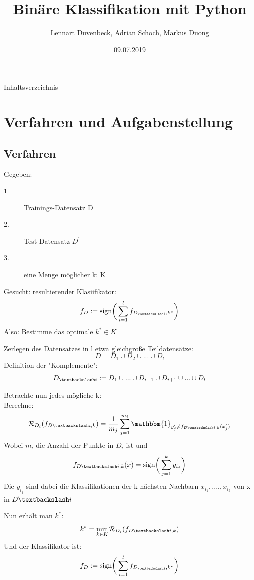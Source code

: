 \documentclass{beamer}
\title{Binäre Klassifikation mit Python}
\author{Lennart Duvenbeck, Adrian Schoch, Markus Duong}
\date{09.07.2019}
\begin{document}
\maketitle
\begin{frame}{Inhaltsverzeichnis}
  \tableofcontents
\end{frame}


\section{Verfahren und Aufgabenstellung}

\subsection{Verfahren}
\begin{frame}
Gegeben: 
\begin{description}
\item[1.] Trainings-Datensatz D
\item[2.] Test-Datensatz $D^{'}$
\item[3.] eine Menge möglicher k: K
\end{description}
Gesucht: resultierender Klasiifikator: 
\[
f_ {D} := \text{sign} \bigg( \sum_{i=1}^{l} f_{D_{\textbackslash i}, k^{*}}\bigg)
\]
Also: Bestimme das optimale $k^* \in K$
\end{frame}



\begin{frame}
Zerlegen des Datensatzes in l etwa gleichgroße Teildatensätze:
\[
D= D_1 \cup D_2 \cup ... \cup D_l
\]
Definition der "Komplemente":
\[
D_{\textbackslash i} := D_{1} \cup ... \cup D_{i-1} \cup D_{i+1} \cup...\cup D_{l}
\]
\end{frame}


\begin{frame}
Betrachte nun jedes mögliche k:\\
Berechne:
\[ \mathcal{R}_{D_i}(f_{D \textbackslash i ,k})= \frac{1}{m_j} \sum_{j=1}^{m_i} \mathbbm{1}_{y_{j}' \neq f_{D \textbackslash i ,k}(x_{j}')}
\]
Wobei $m_i$ die Anzahl der Punkte in $D_i$ ist und  
\[f_{D \textbackslash i ,k}(x) = \text{sign} \bigg( \sum_{j =1}^{k} y_{i_{j}}\bigg)
\]
Die $y_{i_j}$ sind dabei die Klassifikationen der k nächsten Nachbarn 
$x_{i_1},....,x_{i_k}$ von x in $D \textbackslash i$
\end{frame}

\begin{frame}
Nun erhält man $k^*$: 
\[k^* = \min \limits_{k \in K} \mathcal{R}_{D_i}(f_{D \textbackslash i ,k})
\]
Und der Klassifikator ist:
\[f_ {D} := \text{sign} \bigg( \sum_{i=1}^{l} f_{D_{\textbackslash i}, k^{*}}\bigg)
\]
\end{frame}
\end{document}
